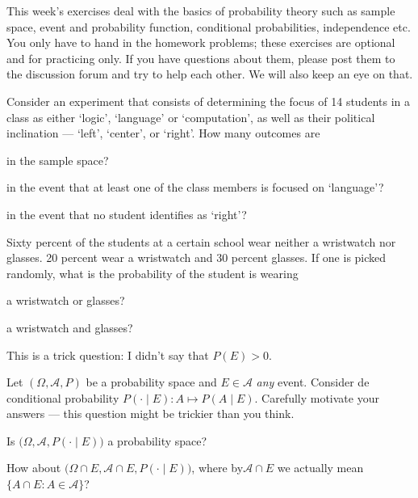 \documentclass[a4paper,10pt,landscape,twocolumn]{scrartcl}
\begin{document}
\practiceproblems

{\sffamily\noindent
This week's exercises deal with the basics of probability theory such
as sample space, event and probability function, conditional
probabilities, independence etc. You only have to hand in the homework problems; these exercises are optional and for practicing only. If you have questions about them, please post them to the discussion forum and try to help each other. We will also keep an eye on that.
}


\begin{exercise}[]
	 Consider an experiment that consists of determining the focus of 14 students in a class as either `logic', `language' or `computation', as well as their political inclination --- `left', `center', or `right'. How many outcomes are
	 
	 \begin{subex}
	 	in the sample space?
	 \end{subex}
	 
	 \begin{subex}
	 	in the event that at least one of the class members is focused on `language'?
	 \end{subex}
	 
	 \begin{subex}
	 	in the event that no student identifies as `right'?
	 \end{subex}
\end{exercise}

\begin{exercise}[]
	 Sixty percent of the students at a certain school wear neither a wristwatch nor glasses. 20 percent wear a wristwatch and 30 percent glasses. If one is picked randomly, what is the probability of the student is wearing
	
	\begin{subex}
		a wristwatch or glasses?
	\end{subex}
	
	\begin{subex}
		a wristwatch and glasses?
	\end{subex}
		
\end{exercise}


\begin{exercise}[]
\begin{mycomment}
	This is a trick question: I didn't say that $P(E)>0$.
\end{mycomment}
Let $(\Omega, \mathcal{A}, P)$ be a probability space and $E\in \mathcal{A}$ \emph{any} event. Consider de conditional probability $P( \cdot \mid E): A \mapsto P(A\mid E)$. Carefully motivate your answers --- this question might be trickier than you think.
	\begin{subex}
		Is $\bigl(\Omega, \mathcal A, P(\cdot \mid E)\bigr)$ a probability space?	
	\end{subex}
	\begin{subex}
		How about $\bigl(\Omega\cap E, \mathcal A\cap E, P(\cdot \mid E)\bigr)$, where by$\mathcal A \cap E$ we actually mean $\{A\cap E: A\in \mathcal A\}$?
	\end{subex}
\end{exercise}
\end{document}
